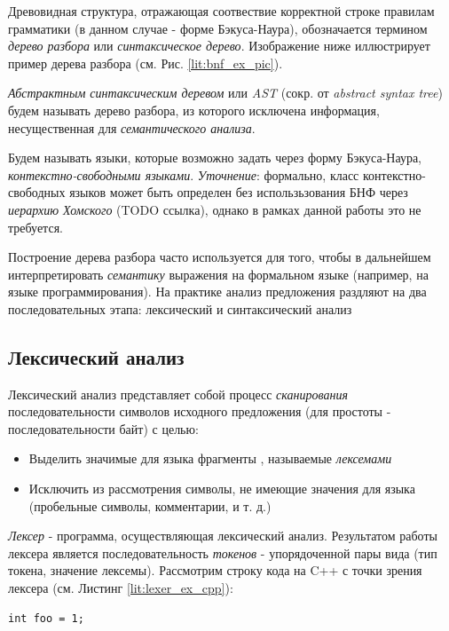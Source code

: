 Древовидная структура, отражающая соотвествие корректной строке правилам грамматики (в данном случае - форме Бэкуса-Наура), обозначается термином \textit{дерево разбора} или \textit{синтаксическое дерево}. Изображение ниже иллюстрирует пример дерева разбора (см. Рис. \ref{lit:bnf_ex_pic}). 

\textit{Абстрактным синтаксическим деревом} или \textit{AST} (сокр. от \textit{abstract syntax tree}) будем называть дерево разбора, из которого исключена информация, несущественная для \textit{семантического анализа}.  

Будем называть языки, которые возможно задать через форму Бэкуса-Наура, \textit{контекстно-свободными языками}. \textit{Уточнение}: формально, класс контекстно-свободных языков может быть определен без использьзования БНФ через \textit{иерархию Хомского} (TODO ссылка), однако в рамках данной работы это не требуется.

Построение дерева разбора часто используется для того, чтобы в дальнейшем интерпретировать \textit{семантику} выражения на формальном языке (например, на языке программирования). На практике анализ предложения раздляют на два последовательных этапа: лексический и синтаксический анализ

\subsection{Лексический анализ}
Лексический анализ представляет собой процесс \textit{сканирования} последовательности символов исходного предложения (для простоты - последовательности байт) с целью:

\begin{itemize}
    \item Выделить значимые для языка фрагменты , называемые \textit{лексемами}
    \item Исключить из рассмотрения символы, не имеющие значения для языка (пробельные символы, комментарии, и т. д.)
\end{itemize}

\textit{Лексер} - программа, осуществляющая лексический анализ. Результатом работы лексера является последовательность \textit{токенов} - упорядоченной пары вида (тип токена, значение лексемы). Рассмотрим строку кода на C++ с точки зрения лексера (см. Листинг \ref{lit:lexer_ex_cpp}):

\begin{code}
\label{lit:lexer_ex_cpp}
\begin{verbatim}
int foo = 1;
\end{verbatim}
\end{code}

